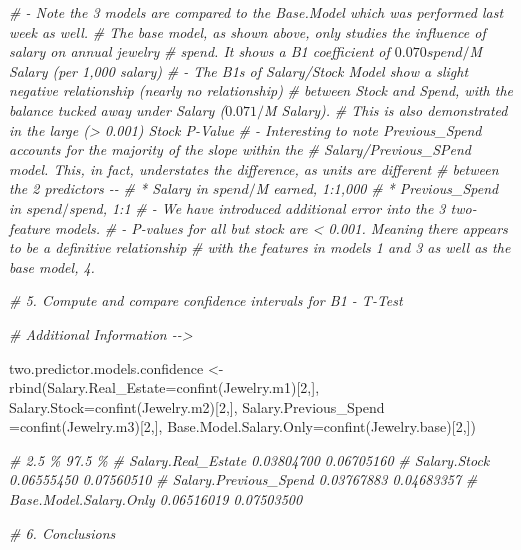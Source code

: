 \documentclass[
]{article}
\newenvironment{Shaded}{\begin{snugshade}}{\end{snugshade}}
\newcommand{\AttributeTok}[1]{\textcolor[rgb]{0.77,0.63,0.00}{#1}}
\newcommand{\CommentTok}[1]{\textcolor[rgb]{0.56,0.35,0.01}{\textit{#1}}}
\newcommand{\DecValTok}[1]{\textcolor[rgb]{0.00,0.00,0.81}{#1}}
\newcommand{\FunctionTok}[1]{\textcolor[rgb]{0.00,0.00,0.00}{#1}}
\newcommand{\NormalTok}[1]{#1}
\newcommand{\OtherTok}[1]{\textcolor[rgb]{0.56,0.35,0.01}{#1}}
\begin{document}
\begin{Shaded}
\begin{Highlighting}[]
    \CommentTok{\# {-} Note the 3 models are compared to the Base.Model which was performed last week as well. }
    \CommentTok{\#   The base model, as shown above, only studies the influence of salary on annual jewelry }
    \CommentTok{\#   spend.  It shows a B1 coefficient of $0.070 spend/$M Salary (per 1,000 salary) }
    \CommentTok{\# {-} The B1s of Salary/Stock Model show a slight negative relationship (nearly no relationship)}
    \CommentTok{\#   between Stock and Spend, with the balance tucked away under Salary ($0.071/$M Salary).}
    \CommentTok{\#   This is also demonstrated in the large (\textgreater{} 0.001) Stock P{-}Value}
    \CommentTok{\# {-} Interesting to note Previous\_Spend accounts for the majority of the slope within the }
    \CommentTok{\#   Salary/Previous\_SPend model. This, in fact, understates the difference, as units are different}
    \CommentTok{\#   between the 2 predictors {-}{-} }
    \CommentTok{\#       * Salary in $spend/$M earned, 1:1,000}
    \CommentTok{\#       * Previous\_Spend in $spend/$spend, 1:1}
    \CommentTok{\# {-} We have introduced additional error into the 3 two{-}feature models. }
    \CommentTok{\# {-} P{-}values for all but stock are \textless{} 0.001.  Meaning there appears to be a definitive relationship}
    \CommentTok{\#   with the features in models 1 and 3 as well as the base model, 4.    }


\CommentTok{\# 5. Compute and compare confidence intervals for B1 {-} T{-}Test}
\end{Highlighting}
\end{Shaded}

\begin{Shaded}
\begin{Highlighting}[]
\CommentTok{\# Additional Information {-}{-}\textgreater{}}

\NormalTok{two.predictor.models.confidence }\OtherTok{\textless{}{-}} \FunctionTok{rbind}\NormalTok{(}\AttributeTok{Salary.Real\_Estate=}\FunctionTok{confint}\NormalTok{(Jewelry.m1)[}\DecValTok{2}\NormalTok{,], }\AttributeTok{Salary.Stock=}\FunctionTok{confint}\NormalTok{(Jewelry.m2)[}\DecValTok{2}\NormalTok{,], }
                                      \AttributeTok{Salary.Previous\_Spend =}\FunctionTok{confint}\NormalTok{(Jewelry.m3)[}\DecValTok{2}\NormalTok{,], }\AttributeTok{Base.Model.Salary.Only=}\FunctionTok{confint}\NormalTok{(Jewelry.base)[}\DecValTok{2}\NormalTok{,])}

    \CommentTok{\#                           2.5 \%     97.5 \%}
    \CommentTok{\# Salary.Real\_Estate     0.03804700 0.06705160      }
    \CommentTok{\# Salary.Stock           0.06555450 0.07560510      }
    \CommentTok{\# Salary.Previous\_Spend  0.03767883 0.04683357      }
    \CommentTok{\# Base.Model.Salary.Only 0.06516019 0.07503500}



\CommentTok{\# 6. Conclusions}
\end{Highlighting}
\end{Shaded}
\end{document}
